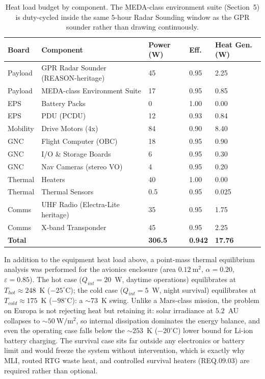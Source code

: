 \documentclass[11pt]{article}
\begin{document}
\begin{table}[H]
\centering
\footnotesize
\begin{tabular}{p{1.6cm}p{3.4cm}p{1.4cm}p{1.2cm}p{1.6cm}}
\toprule
\textbf{Board} & \textbf{Component} & \textbf{Power (W)} & \textbf{Eff.} & \textbf{Heat Gen.
(W)} \\
\midrule
Payload & GPR Radar Sounder (REASON-heritage) & 45 & 0.95 & 2.25 \\
Payload & MEDA-class Environment Suite & 17 & 0.95 & 0.85 \\
EPS & Battery Packs & 0 & 1.00 & 0.00 \\
EPS & PDU (PCDU) & 12 & 0.93 & 0.84 \\
Mobility & Drive Motors (4x) & 84 & 0.90 & 8.40 \\
GNC & Flight Computer (OBC) & 18 & 0.95 & 0.90 \\
GNC & I/O \& Storage Boards & 6 & 0.95 & 0.30 \\
GNC & Nav Cameras (stereo VO) & 4 & 0.95 & 0.20 \\
Thermal & Heaters & 40 & 1.00 & 0.00 \\
Thermal & Thermal Sensors & 0.5 & 0.95 & 0.025 \\
Comms & UHF Radio (Electra-Lite heritage) & 35 & 0.95 & 1.75 \\
Comms & X-band Transponder & 45 & 0.95 & 2.25 \\
\midrule
\textbf{Total} & & \textbf{306.5} & \textbf{0.942} & \textbf{17.76} \\
\bottomrule
\end{tabular}
\caption{Heat load budget by component. The MEDA-class environment suite (Section~5) is
duty-cycled inside the same $5$-hour Radar Sounding window as the GPR sounder rather than drawing
continuously.}
\label{tab:heat-loads}
\end{table}

In addition to the equipment heat load above, a point-mass thermal equilibrium
analysis was performed for the avionics enclosure (area $0.12\ \mathrm{m^2}$, $\alpha = 0.20$,
$\varepsilon = 0.85$). The hot case ($Q_{int} = 20$~W, daytime operations) equilibrates at
$T_{hot} \approx 248$~K ($-25^\circ$C); the cold case ($Q_{int} = 5$~W, night survival)
equilibrates at $T_{cold} \approx 175$~K ($-98^\circ$C): a $\sim 73$~K swing. Unlike a
Mars-class mission, the problem on Europa is not rejecting heat but retaining it: solar
irradiance at $5.2$~AU collapses to $\sim 50\ \mathrm{W/m^2}$, so internal dissipation dominates
the energy balance, and even the operating case falls below the $\sim 253$~K ($-20^\circ$C) lower
bound for Li-ion battery charging. The survival case sits far outside any electronics or battery
limit and would freeze the system without intervention, which is exactly why MLI, routed RTG
waste heat, and controlled survival heaters (REQ.09.03) are required rather than optional.
\end{document}
